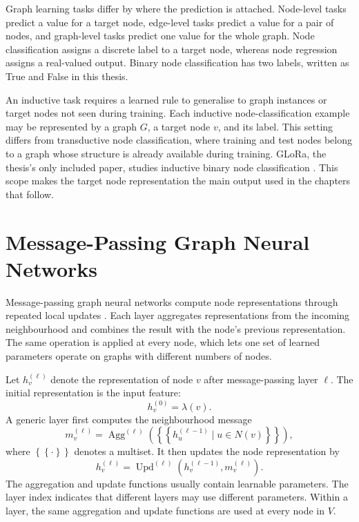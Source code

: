 Graph learning tasks differ by where the prediction is attached.
Node-level tasks predict a value for a target node, edge-level tasks predict a value for a pair of nodes, and graph-level tasks predict one value for the whole graph.
Node classification assigns a discrete label to a target node, whereas node regression assigns a real-valued output.
Binary node classification has two labels, written as True and False in this thesis.

An inductive task requires a learned rule to generalise to graph instances or target nodes not seen during training.
Each inductive node-classification example may be represented by a graph $G$, a target node $v$, and its label.
This setting differs from transductive node classification, where training and test nodes belong to a graph whose structure is already available during training.
GLoRa, the thesis's only included paper, studies inductive binary node classification \cite{zhou2025glora}.
This scope makes the target node representation the main output used in the chapters that follow.

\section{Message-Passing Graph Neural Networks}

Message-passing graph neural networks compute node representations through repeated local updates \cite{scarselli2008graph}.
Each layer aggregates representations from the incoming neighbourhood and combines the result with the node's previous representation.
The same operation is applied at every node, which lets one set of learned parameters operate on graphs with different numbers of nodes.

Let $h_v^{(\ell)}$ denote the representation of node $v$ after message-passing layer $\ell$.
The initial representation is the input feature:
\[
h_v^{(0)}=\lambda(v).
\]
A generic layer first computes the neighbourhood message
\[
m_v^{(\ell)}=\operatorname{Agg}^{(\ell)}\left(\left\{\!\left\{h_u^{(\ell-1)}\mid u\in N(v)\right\}\!\right\}\right),
\]
where $\left\{\!\left\{\cdot\right\}\!\right\}$ denotes a multiset.
It then updates the node representation by
\[
h_v^{(\ell)}=\operatorname{Upd}^{(\ell)}\left(h_v^{(\ell-1)},m_v^{(\ell)}\right).
\]
The aggregation and update functions usually contain learnable parameters.
The layer index indicates that different layers may use different parameters.
Within a layer, the same aggregation and update functions are used at every node in $V$.

